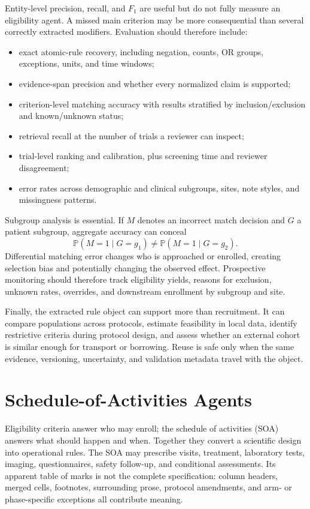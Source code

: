 \documentclass[12pt,oneside]{book}
\numberwithin{equation}{section}
\theoremstyle{definition}
\theoremstyle{plain}
\theoremstyle{remark}
\newcommand{\Prob}{\mathbb{P}}
\begin{document}
Entity-level precision, recall, and $F_1$ are useful but do not fully measure an
eligibility agent.  A missed main criterion may be more consequential than
several correctly extracted modifiers.  Evaluation should therefore include:
\begin{itemize}
    \item exact atomic-rule recovery, including negation, counts, OR groups,
    exceptions, units, and time windows;
    \item evidence-span precision and whether every normalized claim is
    supported;
    \item criterion-level matching accuracy with results stratified by
    inclusion/exclusion and known/unknown status;
    \item retrieval recall at the number of trials a reviewer can inspect;
    \item trial-level ranking and calibration, plus screening time and reviewer
    disagreement;
    \item error rates across demographic and clinical subgroups, sites, note
    styles, and missingness patterns.
\end{itemize}

Subgroup analysis is essential.  If $M$ denotes an incorrect match decision
and $G$ a patient subgroup, aggregate accuracy can conceal
\[
    \Prob(M=1\mid G=g_1)\ne \Prob(M=1\mid G=g_2).
\]
Differential matching error changes who is approached or enrolled, creating
selection bias and potentially changing the observed effect.  Prospective
monitoring should therefore track eligibility yields, reasons for exclusion,
unknown rates, overrides, and downstream enrollment by subgroup and site.

Finally, the extracted rule object can support more than recruitment.  It can
compare populations across protocols, estimate feasibility in local data,
identify restrictive criteria during protocol design, and assess whether an
external cohort is similar enough for transport or borrowing.  Reuse is safe
only when the same evidence, versioning, uncertainty, and validation metadata
travel with the object.

\section{Schedule-of-Activities Agents}

Eligibility criteria answer who may enroll; the schedule of activities (SOA)
answers what should happen and when.  Together they convert a scientific design
into operational rules.  The SOA may prescribe visits, treatment, laboratory
tests, imaging, questionnaires, safety follow-up, and conditional assessments.
Its apparent table of marks is not the complete specification: column headers,
merged cells, footnotes, surrounding prose, protocol amendments, and arm- or
phase-specific exceptions all contribute meaning.
\end{document}
